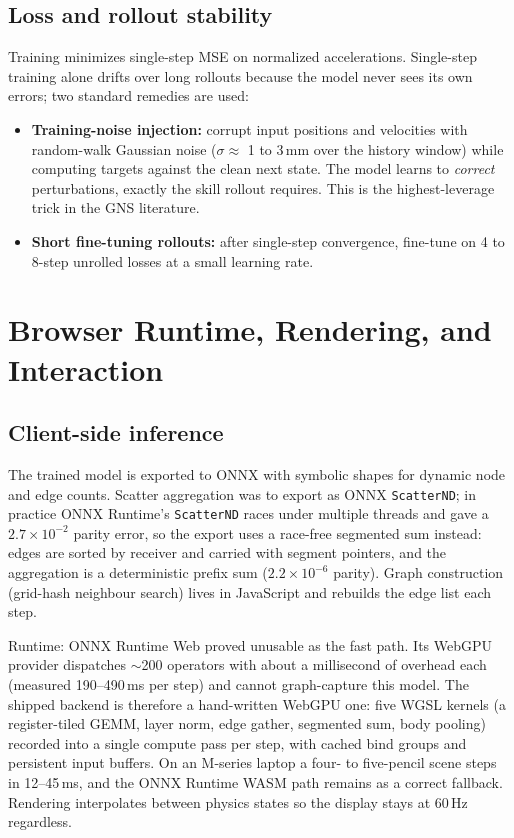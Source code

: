 \documentclass[11pt]{article}
\begin{document}
\subsection{Loss and rollout stability}
\label{sec:loss}
Training minimizes single-step MSE on normalized accelerations. Single-step training alone drifts over long rollouts because the model never sees its own errors; two standard remedies are used:
\begin{itemize}[itemsep=2pt]
  \item \textbf{Training-noise injection:} corrupt input positions and velocities with random-walk Gaussian noise ($\sigma \approx$ 1 to 3\,mm over the history window) while computing targets against the clean next state. The model learns to \emph{correct} perturbations, exactly the skill rollout requires. This is the highest-leverage trick in the GNS literature.
  \item \textbf{Short fine-tuning rollouts:} after single-step convergence, fine-tune on 4 to 8-step unrolled losses at a small learning rate.
\end{itemize}

\section{Browser Runtime, Rendering, and Interaction}
\label{sec:stageE}

\subsection{Client-side inference}
The trained model is exported to ONNX with symbolic shapes for dynamic node and edge counts. Scatter aggregation was to export as ONNX \texttt{ScatterND}; in practice ONNX Runtime's \texttt{ScatterND} races under multiple threads and gave a $2.7\times10^{-2}$ parity error, so the export uses a race-free segmented sum instead: edges are sorted by receiver and carried with segment pointers, and the aggregation is a deterministic prefix sum ($2.2\times10^{-6}$ parity). Graph construction (grid-hash neighbour search) lives in JavaScript and rebuilds the edge list each step.

Runtime: ONNX Runtime Web proved unusable as the fast path. Its WebGPU provider dispatches $\sim$200 operators with about a millisecond of overhead each (measured 190--490\,ms per step) and cannot graph-capture this model. The shipped backend is therefore a hand-written WebGPU one: five WGSL kernels (a register-tiled GEMM, layer norm, edge gather, segmented sum, body pooling) recorded into a single compute pass per step, with cached bind groups and persistent input buffers. On an M-series laptop a four- to five-pencil scene steps in 12--45\,ms, and the ONNX Runtime WASM path remains as a correct fallback. Rendering interpolates between physics states so the display stays at 60\,Hz regardless.
\end{document}
